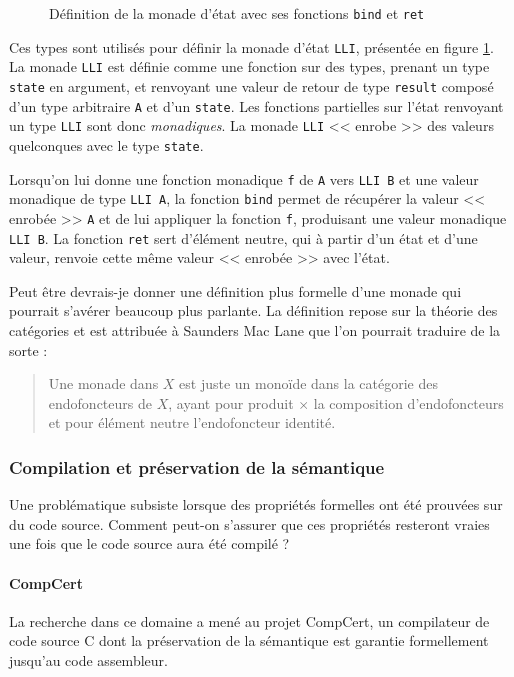 \begin{figure}[!h]
	\caption{Définition de la monade d'état avec ses fonctions \texttt{bind} et \texttt{ret}}
	\label{code:monad}
\end{figure}

Ces types sont utilisés pour définir la monade d'état \texttt{LLI}, présentée en figure \ref{code:monad}. La monade \texttt{LLI} est définie comme une fonction sur des types, prenant un type \texttt{state} en argument, et renvoyant une valeur de retour de type \texttt{result} composé d'un type arbitraire \texttt{A} et d'un \texttt{state}. Les fonctions partielles sur l'état renvoyant un type \texttt{LLI} sont donc \emph{monadiques}. La monade \texttt{LLI} << enrobe >> des valeurs quelconques avec le type \texttt{state}.

Lorsqu'on lui donne une fonction monadique \texttt{f} de \texttt{A} vers \texttt{LLI B} et une valeur monadique de type \texttt{LLI A}, la fonction \texttt{bind} permet de récupérer la valeur << enrobée >> \texttt{A} et de lui appliquer la fonction \texttt{f}, produisant une valeur monadique \texttt{LLI B}. La fonction \texttt{ret} sert d'élément neutre, qui à partir d'un état et d'une valeur, renvoie cette même valeur << enrobée >> avec l'état.

Peut être devrais-je donner une définition plus formelle d'une monade qui pourrait s'avérer beaucoup plus parlante. La définition repose sur la théorie des catégories et est attribuée à Saunders Mac Lane \cite{mac2013categories} que l'on pourrait traduire de la sorte :

\blockquote{Une monade dans $X$ est juste un monoïde dans la catégorie des endofoncteurs de $X$, ayant pour produit $\times$ la composition d'endofoncteurs et pour élément neutre l'endofoncteur identité.}

			\subsubsection{Compilation et préservation de la sémantique}
				Une problématique subsiste lorsque des propriétés formelles ont été prouvées sur du code source. Comment peut-on s'assurer que ces propriétés resteront vraies une fois que le code source aura été compilé ?

				\paragraph{CompCert} La recherche dans ce domaine a mené au projet CompCert\cite{Leroy-backend}, un compilateur de code source C dont la préservation de la sémantique est garantie formellement jusqu'au code assembleur.

